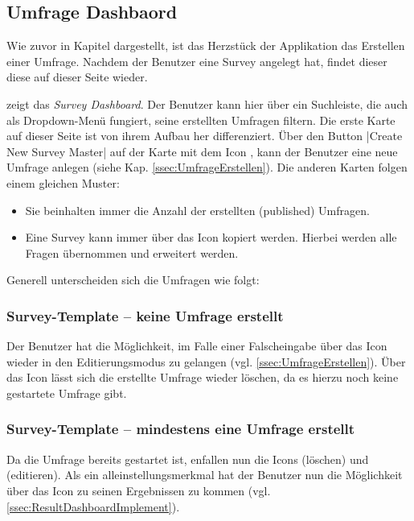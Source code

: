 \subsection{Umfrage Dashbaord}
\label{ssec:UmfrageDashboard}

Wie zuvor in Kapitel  dargestellt, ist das Herzstück der Applikation das Erstellen einer Umfrage. 
Nachdem der Benutzer eine Survey angelegt hat, findet dieser diese auf dieser Seite wieder.

\abb {} zeigt das \emph{Survey Dashboard}.
Der Benutzer kann hier über ein Suchleiste, die auch als Dropdown-Menü fungiert, seine erstellten Umfragen filtern. \newline
Die erste Karte auf dieser Seite ist von ihrem Aufbau her differenziert. Über den Button \jinline|Create New Survey Master| auf der Karte mit dem Icon \faPlusSquare, kann der Benutzer eine neue Umfrage  anlegen (siehe Kap. \vref{ssec:UmfrageErstellen}). \newline
Die anderen Karten folgen einem gleichen Muster: 
\begin{itemize}
	\item Sie beinhalten immer die Anzahl der erstellten (published) Umfragen.
	\item Eine Survey kann immer über das Icon \faCopy\xspace kopiert werden. 
	Hierbei werden alle Fragen übernommen und erweitert werden. 
\end{itemize}
%
Generell unterscheiden sich die Umfragen wie folgt:
%
%
\subsubsection*{Survey-Template -- keine Umfrage erstellt}
%
Der Benutzer hat die Möglichkeit, im Falle einer Falscheingabe über das Icon \faEdit\xspace wieder in den Editierungsmodus zu gelangen (vgl. \vref{ssec:UmfrageErstellen}).
Über das Icon \faTrash\xspace lässt sich die erstellte Umfrage wieder löschen, da es hierzu noch keine gestartete Umfrage gibt. 

\subsubsection*{Survey-Template -- mindestens eine Umfrage erstellt}
%
Da die Umfrage bereits gestartet ist, enfallen nun die Icons \faTrash\xspace (löschen) und \faEdit\xspace (editieren).
Als ein alleinstellungsmerkmal hat der Benutzer nun die Möglichkeit über das Icon \faIdCard\xspace zu seinen Ergebnissen zu kommen (vgl. \vref{ssec:ResultDashboardImplement}).

